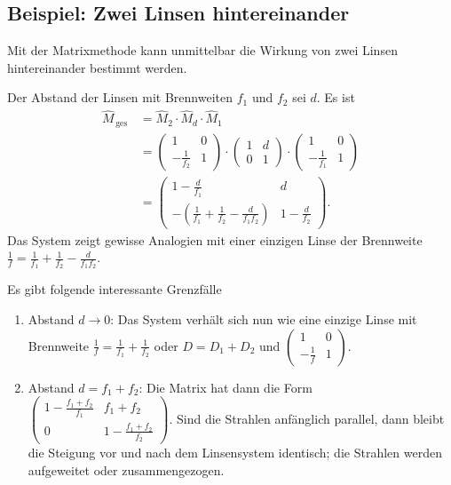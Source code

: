 \documentclass[a4paper,12pt]{article}
\numberwithin{equation}{section}
\begin{document}
\subsection{Beispiel: Zwei Linsen hintereinander}
Mit der Matrixmethode kann unmittelbar die Wirkung von zwei Linsen hintereinander bestimmt werden.\par
Der Abstand der Linsen mit Brennweiten $f_1$ und $f_2$ sei $d$. Es ist
\begin{align} 
        \hat{M}_{\,\text{ges}\,}&=\hat{M}_2\cdot \hat{M}_d\cdot \hat{M}_1\\
                                &=\begin{pmatrix}
                                        1&0\\-\tfrac{1}{f_2}&1
                                \end{pmatrix}\cdot \begin{pmatrix}
                                        1&d\\0&1
                                \end{pmatrix}\cdot \begin{pmatrix}
                                        1&0\\-\tfrac{1}{f_1}&1
                                \end{pmatrix}\\
                                &=\begin{pmatrix}
                                        1-\tfrac{d}{f_1}&d\\
                                        -\left(\tfrac{1}{f_1}+\tfrac{1}{f_2}-\tfrac{d}{f_1f_2}\right)&1-\tfrac{d}{f_2}
                                \end{pmatrix}
.\end{align} 
Das System zeigt gewisse Analogien mit einer einzigen Linse der Brennweite $\tfrac{1}{f}=\tfrac{1}{f_1}+\tfrac{1}{f_2}-\tfrac{d}{f_1f_2}$.\par
Es gibt folgende interessante Grenzfälle
\begin{enumerate}[label=\roman*)]
        \item Abstand $d\rightarrow 0$: Das System verhält sich nun wie eine einzige Linse mit Brennweite $\tfrac{1}{f}=\tfrac{1}{f_1}+\tfrac{1}{f_2}$ oder $D=D_1+D_2$ und $\begin{pmatrix}
                        1&0\\-\tfrac{1}{f}&1
        \end{pmatrix}$.
        \item Abstand $d=f_1+f_2$: Die Matrix hat dann die Form $\begin{pmatrix}
                        1-\tfrac{f_1+f_2}{f_1}&f_1+f_2\\0&1-\tfrac{f_1+f_2}{f_2}
        \end{pmatrix}$. Sind die Strahlen anfänglich parallel, dann bleibt die Steigung vor und nach dem Linsensystem identisch; die Strahlen werden aufgeweitet oder zusammengezogen.
\end{enumerate}
\end{document}
